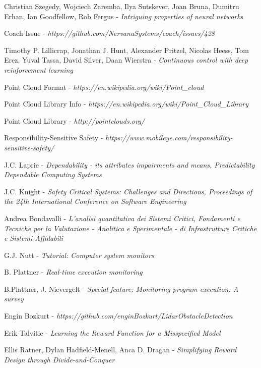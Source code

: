 \begin{thebibliography}{9}
Christian Szegedy, Wojciech Zaremba, Ilya Sutskever, Joan Bruna, Dumitru Erhan, Ian Goodfellow, Rob Fergus - \textit{Intriguing properties of neural networks}

Coach Issue - \textit{https://github.com/NervanaSystems/coach/issues/428}

Timothy P. Lillicrap, Jonathan J. Hunt, Alexander Pritzel, Nicolas Heess, Tom Erez, Yuval Tassa, David Silver, Daan Wierstra - \textit{Continuous control with deep reinforcement learning}

Point Cloud Format - \textit{https://en.wikipedia.org/wiki/Point\_cloud}

Point Cloud Library Info - \textit{https://en.wikipedia.org/wiki/Point\_Cloud\_Library}

Point Cloud Library - \textit{http://pointclouds.org/}

Responsibility-Sensitive Safety - \textit{https://www.mobileye.com/responsibility-sensitive-safety/}

J.C. Laprie - \textsl{Dependability - its attributes impairments and means, Predictability Dependable Computing Systems}

J.C. Knight - \textsl{Safety Critical Systems: Challenges and Directions, Proceedings of the 24th International Conference on Software Engineering}

Andrea Bondavalli - \textsl{L'analisi quantitativa dei Sistemi Critici, Fondamenti e Tecniche per la Valutazione - Analitica e Sperimentale - di Infrastrutture Critiche e Sistemi Affidabili}

G.J. Nutt - \textsl{Tutorial: Computer system monitors}

B. Plattner - \textsl{Real-time execution monitoring}

B.Plattner, J. Nievergelt - \textsl{Special feature: Monitoring program execution: A survey}

Engin Bozkurt - \textsl{https://github.com/enginBozkurt/LidarObstacleDetection}

Erik Talvitie - \textsl{Learning the Reward Function for a Misspecified Model}

Ellis Ratner, Dylan Hadfield-Menell, Anca D. Dragan - \textsl{Simplifying Reward Design	through Divide-and-Conquer}


\end{thebibliography}
